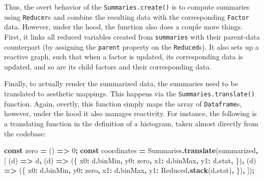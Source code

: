 \documentclass[
  openany]{book}
\newenvironment{Shaded}{\begin{snugshade}}{\end{snugshade}}
\newcommand{\AttributeTok}[1]{\textcolor[rgb]{0.13,0.29,0.53}{#1}}
\newcommand{\DecValTok}[1]{\textcolor[rgb]{0.00,0.00,0.81}{#1}}
\newcommand{\FunctionTok}[1]{\textcolor[rgb]{0.13,0.29,0.53}{\textbf{#1}}}
\newcommand{\KeywordTok}[1]{\textcolor[rgb]{0.13,0.29,0.53}{\textbf{#1}}}
\newcommand{\NormalTok}[1]{#1}
\newcommand{\OperatorTok}[1]{\textcolor[rgb]{0.81,0.36,0.00}{\textbf{#1}}}
\theoremstyle{definition}
\theoremstyle{definition}
\theoremstyle{definition}
\theoremstyle{definition}
\theoremstyle{remark}
\begin{document}
Thus, the overt behavior of the \texttt{Summaries.create()} is to compute summaries using \texttt{Reducer}s and combine the resulting data with the corresponding \texttt{Factor} data. However, under the hood, the function also does a couple more things. First, it links all reduced variables created from \texttt{summaries} with their parent-data counterpart (by assigning the \texttt{parent} property on the \texttt{Reduced}s). It also sets up a reactive graph, such that when a factor is updated, its corresponding data is updated, and so are its child factors and their corresponding data.

Finally, to actually render the summarized data, the summaries need to be translated to aesthetic mappings. This happens via the \texttt{Summaries.translate()} function. Again, overtly, this function simply maps the array of \texttt{Dataframe}s, however, under the hood it also manages reactivity. For instance, the following is a translating function in the definition of a histogram, taken almost directly from the codebase:

\begin{Shaded}
\begin{Highlighting}[]
\KeywordTok{const}\NormalTok{ zero }\OperatorTok{=}\NormalTok{ () }\KeywordTok{=\textgreater{}} \DecValTok{0}\OperatorTok{;}
\KeywordTok{const}\NormalTok{ coordinates }\OperatorTok{=}\NormalTok{ Summaries}\OperatorTok{.}\FunctionTok{translate}\NormalTok{(summarized}\OperatorTok{,}\NormalTok{ [}
\NormalTok{  (d) }\KeywordTok{=\textgreater{}}\NormalTok{ d}\OperatorTok{,}
\NormalTok{  (d) }\KeywordTok{=\textgreater{}}\NormalTok{ (\{}
\NormalTok{      x0}\OperatorTok{:}\NormalTok{ d}\OperatorTok{.}\AttributeTok{binMin}\OperatorTok{,}
\NormalTok{      y0}\OperatorTok{:}\NormalTok{ zero}\OperatorTok{,}
\NormalTok{      x1}\OperatorTok{:}\NormalTok{ d}\OperatorTok{.}\AttributeTok{binMax}\OperatorTok{,}
\NormalTok{      y1}\OperatorTok{:}\NormalTok{ d}\OperatorTok{.}\AttributeTok{stat}\OperatorTok{,}
\NormalTok{  \})}\OperatorTok{,}
\NormalTok{  (d) }\KeywordTok{=\textgreater{}}\NormalTok{ (\{}
\NormalTok{    x0}\OperatorTok{:}\NormalTok{ d}\OperatorTok{.}\AttributeTok{binMin}\OperatorTok{,}
\NormalTok{    y0}\OperatorTok{:}\NormalTok{ zero}\OperatorTok{,}
\NormalTok{    x1}\OperatorTok{:}\NormalTok{ d}\OperatorTok{.}\AttributeTok{binMax}\OperatorTok{,}
\NormalTok{    y1}\OperatorTok{:}\NormalTok{ Reduced}\OperatorTok{.}\FunctionTok{stack}\NormalTok{(d}\OperatorTok{.}\AttributeTok{stat}\NormalTok{)}\OperatorTok{,}
\NormalTok{  \})}\OperatorTok{,}
\NormalTok{])}\OperatorTok{;}
\end{Highlighting}
\end{Shaded}
\end{document}
